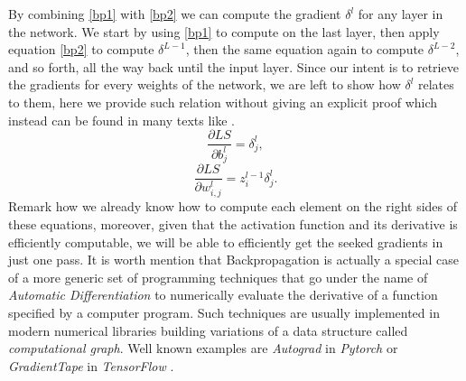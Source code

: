 \documentclass[LaM,binding=0.6cm]{./packages/sapthesis/sapthesis}
\begin{document}
                By combining \ref{bp1} with \ref{bp2} we can compute the gradient $\delta^{l}$ for any layer in the network. We start by using \ref{bp1} to compute on the last layer, 
                then apply equation \ref{bp2} to compute $\delta^{L-1}$, then the same equation again to compute $\delta^{L-2}$, and so forth, 
                all the way back until the input layer. Since our intent is to retrieve the gradients for every weights of the network, we are left to 
                show how $ \delta^l $ relates to them, here we provide such relation without giving an explicit proof which instead can be found in many
                texts like \cite{nielsen2015neural}.
                \begin{equation}
                    \frac{\partial LS}{\partial b^{l}_{j}} = \delta^{l}_{j},
                \end{equation}
                \begin{equation}
                    \frac{\partial LS}{\partial w^{l}_{i,j}} = z^{l-1}_i \delta^{l}_{j}.
                \end{equation}
                Remark how we already know how to compute each element on the right sides of these equations, moreover, given that the activation function
                and its derivative is efficiently computable, we will be able to efficiently get the seeked gradients in just one pass.
                It is worth mention that Backpropagation is actually a special case of a more generic set of programming techniques that go under
                the name of \textit{Automatic Differentiation} \cite{adiff} to numerically evaluate the derivative of a function specified by a computer program.
                Such techniques are usually implemented in modern numerical libraries building variations of a data structure called \textit{computational graph}.
                Well known examples are \textit{Autograd} in \textit{Pytorch} \cite{pytorch} or \textit{GradientTape} in \textit{TensorFlow} \cite{tensorf}.
\end{document}
